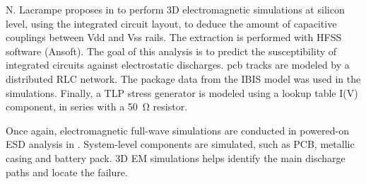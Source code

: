 N. Lacrampe proposes in \cite{LacrampeTransientImmunity} to perform 3D electromagnetic simulations at silicon level, using the integrated circuit layout, to deduce the amount of capacitive couplings between Vdd and Vss rails.
The extraction is performed with HFSS software (Ansoft).
The goal of this analysis is to predict the susceptibility of integrated circuits against electrostatic discharges.
\gls{pcb} tracks are modeled by a distributed RLC network.
The package data from the IBIS model \cite{ibis-spec} was used in the simulations.
Finally, a TLP stress generator is modeled using a lookup table I(V) component, in series with a \SI{50}{\ohm} resistor.

Once again, electromagnetic full-wave simulations are conducted in powered-on ESD analysis in \cite{softFailMobile}.
System-level components are simulated, such as PCB, metallic casing and battery pack.
3D EM simulations helps identify the main discharge paths and locate the failure.
